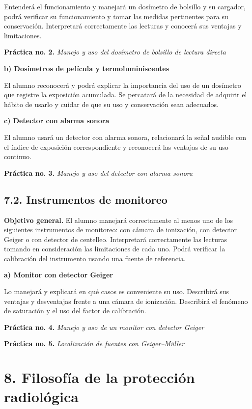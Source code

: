 Entenderá el funcionamiento y manejará un dosímetro de bolsillo y su cargador, podrá verificar su funcionamiento y tomar las medidas pertinentes para su conservación. Interpretará correctamente las lecturas y conocerá sus ventajas y limitaciones.

\textbf{Práctica no. 2.} \emph{Manejo y uso del dosímetro de bolsillo de lectura directa} 

\textbf{b) Dosímetros de película y termoluminiscentes }

El alumno reconocerá y podrá explicar la importancia del uso de un dosímetro que registre la exposición acumulada. Se percatará de la necesidad de adquirir el hábito de usarlo y cuidar de que su uso y conservación sean adecuados.

\textbf{c) Detector con alarma sonora }

El alumno usará un detector con alarma sonora, relacionará la señal audible con el índice de exposición correspondiente y reconocerá las ventajas de su uso continuo.

\textbf{Práctica no. 3.} \emph{Manejo y uso del detector con alarma sonora} 

\subsection*{7.2. Instrumentos de monitoreo}
\textbf{Objetivo general.} El alumno manejará correctamente al menos uno de los siguientes instrumentos de monitoreo: con cámara de ionización, con detector Geiger o con detector de centelleo. Interpretará correctamente las lecturas tomando en consideración las limitaciones de cada uno. Podrá verificar la calibración del instrumento usando una fuente de referencia.

\textbf{a) Monitor con detector Geiger }

Lo manejará y explicará en qué casos es conveniente su uso. Describirá sus ventajas y desventajas frente a una cámara de ionización. Describirá el fenómeno de saturación y el uso del factor de calibración.

\textbf{Práctica no. 4.} \emph{Manejo y uso de un monitor con detector Geiger} 

\textbf{Práctica no. 5.} \emph{Localización de fuentes con Geiger--Müller} 

\section*{8. Filosofía de la protección radiológica }

